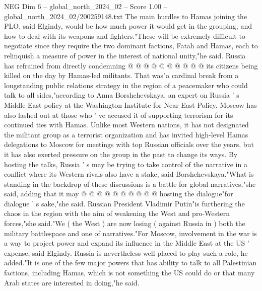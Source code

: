\begin{textsample}{NEG Dim 6 – global\_north\_2024\_02 – Score 1.00 – global\_north\_2024\_02/200259148.txt}
The main hurdles to Hamas joining the PLO, said Elgindy, would be how much power it would get in the grouping, and how to deal with its weapons and fighters."These will be extremely difficult to negotiate since they require the two dominant factions, Fatah and Hamas, each to relinquish a measure of power in the interest of national unity,"he said.
Russia has refrained from directly condemning @ @ @ @ @ @ @ @ @ @ its citizens being killed on the day by Hamas-led militants.
That was"a cardinal break from a longstanding public relations strategy in the region of a peacemaker who could talk to all sides,"according to Anna Borshchevskaya, an expert on Russia ' s Middle East policy at the Washington Institute for Near East Policy.
Moscow has also lashed out at those who ' ve accused it of supporting terrorism for its continued ties with Hamas.
Unlike most Western nations, it has not designated the militant group as a terrorist organization and has invited high-level Hamas delegations to Moscow for meetings with top Russian officials over the years, but it has also exerted pressure on the group in the past to change its ways.
By hosting the talks, Russia ' s may be trying to take control of the narrative in a conflict where its Western rivals also have a stake, said Borshchevskaya."What is standing in the backdrop of these discussions is a battle for global narratives,"she said, adding that it may @ @ @ @ @ @ @ @ @ @ hosting the dialogue"for dialogue ' s sake,"she said.
Russian President Vladimir Putin"is furthering the chaos in the region with the aim of weakening the West and pro-Western forces,"she said."We ( the West ) are now losing ( against Russia in ) both the military battlespace and one of narratives."For Moscow, involvement in the war is a way to project power and expand its influence in the Middle East at the US ' expense, said Elgindy.
Russia is nevertheless well placed to play such a role, he added."It is one of the few major powers that has ability to talk to all Palestinian factions, including Hamas, which is not something the US could do or that many Arab states are interested in doing,"he said.

\end{textsample}
